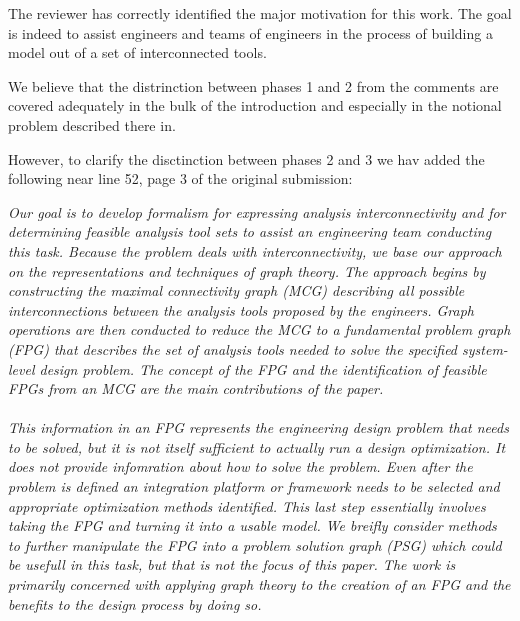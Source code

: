 \documentclass{aiaa-tc}
\begin{document}
The reviewer has correctly identified the major motivation for this work. The goal is indeed to 
assist engineers and teams of engineers in the process of building a model out of a set of interconnected 
tools. 

We believe that the distrinction between phases 1 and 2 from the comments are covered adequately 
in the bulk of the introduction and especially in the notional problem described there in. 

However, to clarify the disctinction between phases 2 and 3 we hav added the following near 
line 52, page 3 of the original submission: 

\emph{%
Our goal is to develop formalism for expressing analysis interconnectivity and for determining feasible
    analysis tool sets to assist an engineering team conducting this task. Because the problem deals with
    interconnectivity, we base our approach on the representations and techniques of graph theory.
    The approach begins by constructing the \emph{maximal connectivity graph (MCG)} describing all possible
    interconnections between the analysis tools proposed by the engineers. Graph operations are then
    conducted to reduce the MCG to a \emph{fundamental problem graph (FPG)} that describes the set of analysis
    tools needed to solve the specified system-level design problem. The concept of the FPG and the identification of feasible FPGs from an MCG are the main contributions of the paper. \\\\
    This information in an FPG represents the engineering design problem that needs to be solved, but it is not 
    itself sufficient to actually run a design optimization. It does not provide infomration 
    about how to solve the problem. Even after the problem is defined an integration platform or framework needs 
    to be selected and appropriate optimization methods identified. This last step essentially 
    involves taking the FPG and turning it into a usable model. We breifly consider methods to further 
    manipulate the FPG into a \emph{problem solution graph (PSG)} which could be usefull in this 
    task, but that is not the focus of this paper. The work is primarily concerned with applying graph 
    theory to the creation of an FPG and the benefits to the design process by doing so.}
\end{document}
